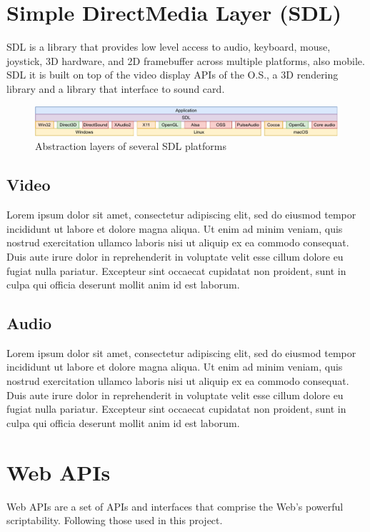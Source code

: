 \section{Simple DirectMedia Layer (SDL)}
SDL is a library that provides low level access to audio, keyboard, mouse, joystick, 3D hardware, and 2D framebuffer across multiple platforms, also mobile. SDL it is built on top of the video display APIs of the O.S., a 3D rendering library and a library that interface to sound card\cite{SDL_Wiki}.

\begin{figure}[H]
	\includegraphics[width=\linewidth]{immagini/sdl}
	\caption{Abstraction layers of several SDL platforms}
	\label{fig:sdl}
\end{figure}

\subsection{Video}
Lorem ipsum dolor sit amet, consectetur adipiscing elit, sed do eiusmod tempor incididunt ut labore et dolore magna aliqua. Ut enim ad minim veniam, quis nostrud exercitation ullamco laboris nisi ut aliquip ex ea commodo consequat. Duis aute irure dolor in reprehenderit in voluptate velit esse cillum dolore eu fugiat nulla pariatur. Excepteur sint occaecat cupidatat non proident, sunt in culpa qui officia deserunt mollit anim id est laborum.

\subsection{Audio}
Lorem ipsum dolor sit amet, consectetur adipiscing elit, sed do eiusmod tempor incididunt ut labore et dolore magna aliqua. Ut enim ad minim veniam, quis nostrud exercitation ullamco laboris nisi ut aliquip ex ea commodo consequat. Duis aute irure dolor in reprehenderit in voluptate velit esse cillum dolore eu fugiat nulla pariatur. Excepteur sint occaecat cupidatat non proident, sunt in culpa qui officia deserunt mollit anim id est laborum.



\section{Web APIs}
Web APIs are a set of APIs and interfaces that comprise the Web's powerful scriptability. Following those used in this project\cite{Web_APIs}.

